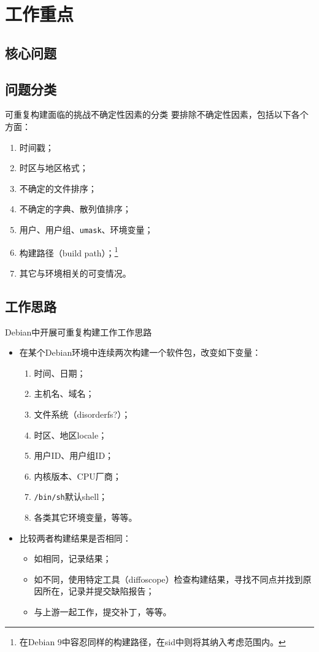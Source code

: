 \documentclass{beamer}
\begin{document}
\section{工作重点}
\subsection{核心问题}
\subsection{问题分类}
\begin{frame}{可重复构建面临的挑战}{不确定性因素的分类}
要排除不确定性因素，包括以下各个方面：

\vspace{1em}
\begin{enumerate}
\item 时间戳；
\item 时区与地区格式；
\item 不确定的文件排序；
\item 不确定的字典、散列值排序；
\item 用户、用户组、\texttt{umask}、环境变量；
\item 构建路径（build path）；\footnote{在Debian 9中容忍同样的构建路径，在sid中则将其纳入考虑范围内。\vspace{1em}}
\item 其它与环境相关的可变情况。
\end{enumerate}
\end{frame}
\subsection{工作思路}
\begin{frame}{Debian中开展可重复构建工作}{工作思路}
\begin{itemize}
\item {在某个Debian环境中连续两次构建一个软件包，改变如下变量：
  \begin{enumerate}
  \item 时间、日期；
  \item 主机名、域名；
  \item 文件系统（disorderfs?）；
  \item 时区、地区locale；
  \item 用户ID、用户组ID；
  \item 内核版本、CPU厂商；
  \item \texttt{/bin/sh}默认shell；
  \item 各类其它环境变量，等等。
  \end{enumerate}
  }
\item {比较两者构建结果是否相同：
  \begin{itemize}
    \item 如相同，记录结果；
    \item 如不同，使用特定工具（diffoscope）检查构建结果，寻找不同点并找到原因所在，记录并提交缺陷报告；
    \item 与上游一起工作，提交补丁，等等。
  \end{itemize}
}
\end{itemize}
\end{frame}
\end{document}
